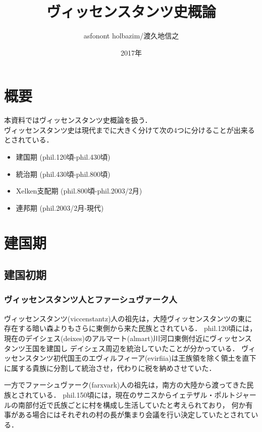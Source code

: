 \documentclass[11pt,a4j]{jarticle}
\begin{document}
{
\title{\Huge ヴィッセンスタンツ史概論}
\author{asfonont holbazim/渡久地信之}
\date{2017年}
}
\maketitle

\thispagestyle{empty}
\newpage

\tableofcontents

\thispagestyle{empty}
\newpage
\setcounter{page}{1}

\section{概要}
本資料ではヴィッセンスタンツ史概論を扱う．\\
ヴィッセンスタンツ史は現代までに大きく分けて次の4つに分けることが出来るとされている．
\begin{itemize}
 \item 建国期 (phil.120頃-phil.430頃)
 \item 統治期 (phil.430頃-phil.800頃)
 \item Xelken支配期 (phil.800頃-phil.2003/2月)
 \item 連邦期 (phil.2003/2月-現代)
\end{itemize}

\section{建国期}
\subsection{建国初期}
\subsubsection{ヴィッセンスタンツ人とファーシュヴァーク人}
ヴィッセンスタンツ(viccenstantz)人の祖先は，大陸ヴィッセンスタンツの東に存在する暗い森よりもさらに東側から来た民族とされている．
phil.120頃には，現在のデイシェス(deixes)のアルマート(almart)川河口東側付近にヴィッセンスタンツ王国を建国し
デイシェス周辺を統治していたことが分かっている．
ヴィッセンスタンツ初代国王のエヴィルフィーア(evirfiia)は王族領を除く領土を直下に属する貴族に分割して統治させ，代わりに税を納めさせていた．

一方でファーシュヴァーク(farxvark)人の祖先は，南方の大陸から渡ってきた民族とされている．
phil.150頃には，現在のサニスからイェテザル・ポルトジャールの南部付近で氏族ごとに村を構成し生活していたと考えられており，
何か有事がある場合にはそれぞれの村の長が集まり会議を行い決定していたとされている．
\end{document}
